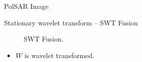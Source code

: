 \documentclass[10pt]{beamer}
\begin{document}
\begin{frame}[fragile]{PolSAR Image}
\begin{alertblock}{Stationary wavelet transform -- SWT Fusion}
\begin{figure}[htb!]
\begin{tikzpicture}
\end{tikzpicture}
	\caption{SWT Fusion.}
\label{fig7}
\end{figure}
\begin{itemize}
\vspace{-0.8cm}
\item $W$ is wavelet transformed.
\end{itemize}
\end{alertblock}
\end{frame}




\end{document}
